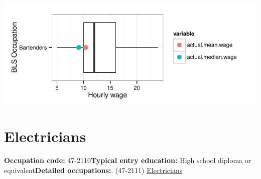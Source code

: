 \documentclass[a4paper,10pt]{article}\usepackage[]{graphicx}\usepackage[]{color}
\makeatletter
\def\maxwidth{ %
  \ifdim\Gin@nat@width>\linewidth
    \linewidth
  \else
    \Gin@nat@width
  \fi
}
\makeatother
\begin{document}
{\centering \includegraphics[width=\maxwidth]{figure/unnamed-chunk-261} 

}


\newpage\section{Electricians}\textbf{Occupation code:} 47-2110\newline\textbf{Typical entry education:} High school diploma or equivalent\newline\textbf{Detailed occupations:}. (47-2111)  \href{http://www.bls.gov/oes/current/oes472111.htm}{Electricians}\newline%
\end{document}
